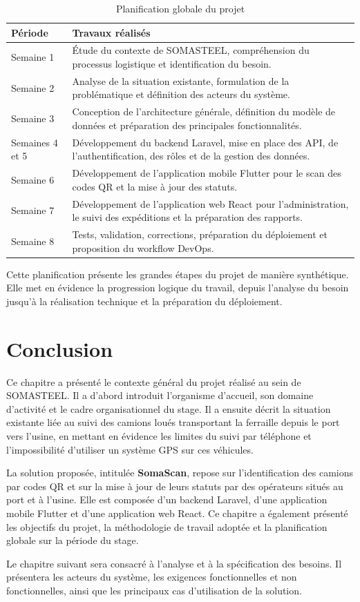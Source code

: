 \begin{table}[H]
\centering
\begin{tabular}{|p{4cm}|p{10cm}|}
\hline
\textbf{Période} & \textbf{Travaux réalisés} \\
\hline
Semaine 1 & Étude du contexte de SOMASTEEL, compréhension du processus logistique et identification du besoin. \\
\hline
Semaine 2 & Analyse de la situation existante, formulation de la problématique et définition des acteurs du système. \\
\hline
Semaine 3 & Conception de l'architecture générale, définition du modèle de données et préparation des principales fonctionnalités. \\
\hline
Semaines 4 et 5 & Développement du backend Laravel, mise en place des API, de l'authentification, des rôles et de la gestion des données. \\
\hline
Semaine 6 & Développement de l'application mobile Flutter pour le scan des codes QR et la mise à jour des statuts. \\
\hline
Semaine 7 & Développement de l'application web React pour l'administration, le suivi des expéditions et la préparation des rapports. \\
\hline
Semaine 8 & Tests, validation, corrections, préparation du déploiement et proposition du workflow DevOps. \\
\hline
\end{tabular}
\caption{Planification globale du projet}
\label{tab:planning-projet}
\end{table}

Cette planification présente les grandes étapes du projet de manière synthétique. Elle met en évidence la progression logique du travail, depuis l'analyse du besoin jusqu'à la réalisation technique et la préparation du déploiement.

\section{Conclusion}

Ce chapitre a présenté le contexte général du projet réalisé au sein de SOMASTEEL. Il a d'abord introduit l'organisme d'accueil, son domaine d'activité et le cadre organisationnel du stage. Il a ensuite décrit la situation existante liée au suivi des camions loués transportant la ferraille depuis le port vers l'usine, en mettant en évidence les limites du suivi par téléphone et l'impossibilité d'utiliser un système GPS sur ces véhicules.

La solution proposée, intitulée \textbf{SomaScan}, repose sur l'identification des camions par codes QR et sur la mise à jour de leurs statuts par des opérateurs situés au port et à l'usine. Elle est composée d'un backend Laravel, d'une application mobile Flutter et d'une application web React. Ce chapitre a également présenté les objectifs du projet, la méthodologie de travail adoptée et la planification globale sur la période du stage.

Le chapitre suivant sera consacré à l'analyse et à la spécification des besoins. Il présentera les acteurs du système, les exigences fonctionnelles et non fonctionnelles, ainsi que les principaux cas d'utilisation de la solution.
